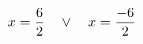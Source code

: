 \documentclass[preview]{standalone}
\begin{document}
\begin{align*}
\special{dvisvgm:raw <g id='unique000'>}x=\frac{6}{2} \quad \lor \quad x=\frac{-6}{2}\special{dvisvgm:raw </g>}
\end{align*}
\end{document}
